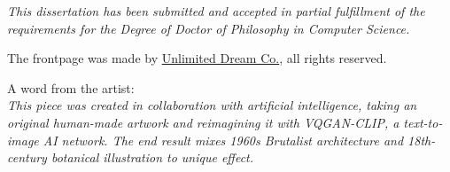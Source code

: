 
\vspace*{\fill}
\vspace*{\fill}
\vspace*{\fill}
\begin{center}
\textit{
This dissertation has been submitted and accepted in partial fulfillment of
the requirements for the Degree of Doctor of Philosophy in
Computer Science.
}
\end{center}

\vspace*{\fill}
\vspace*{\fill}
\vspace*{\fill}
\newpage


\vspace*{\fill}
\begin{center}
The frontpage was made by \href{https://www.unlimiteddreamco.xyz/}{Unlimited Dream Co.}, all rights reserved.\\
\end{center}
A word from the artist: \\
\textit{This piece was created in collaboration with artificial intelligence, taking an original human-made artwork and reimagining it with VQGAN-CLIP, a text-to-image AI network. The end result mixes 1960s Brutalist architecture and 18th-century botanical illustration to unique effect.}
\vspace*{\fill}
\vspace*{\fill}
\vspace*{\fill}
